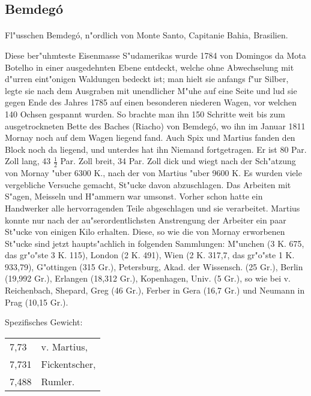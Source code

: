 \documentclass[a4paper, 11pt, oneside]{article}
\begin{document}
\subsection{Bemdegó}
\normalsize
\paragraph{}
Fl"usschen Bemdegó, n"ordlich von Monte Santo, Capitanie Bahia, Brasilien.

Diese ber"uhmteste Eisenmasse S"udamerikas wurde 1784 von Domingos da Mota Botelho in einer ausgedehnten Ebene entdeckt, welche ohne Abwechselung mit d"urren eint"onigen Waldungen bedeckt ist; man hielt sie anfangs f"ur Silber, legte sie nach dem Ausgraben mit unendlicher M"uhe auf eine Seite und lud sie gegen Ende des Jahres 1785 auf einen besonderen niederen Wagen, vor welchen 140 Ochsen gespannt wurden. So brachte man ihn 150 Schritte weit bis zum ausgetrockneten Bette des Baches (Riacho) von Bemdegó, wo ihn im Januar 1811 Mornay noch auf dem Wagen liegend fand. Auch Spix und Martius fanden den Block noch da liegend, und unterdes hat ihn Niemand fortgetragen. Er ist 80 Par. Zoll lang, 43 $\frac{1}{2}$ Par. Zoll breit, 34 Par. Zoll dick und wiegt nach der Sch"atzung von Mornay "uber 6300 K., nach der von Martius "uber 9600 K. Es wurden viele vergebliche Versuche gemacht, St"ucke davon abzuschlagen. Das Arbeiten mit S"agen, Meisseln und H"ammern war umsonst. Vorher schon hatte ein Handwerker alle hervorragenden Teile abgeschlagen und sie verarbeitet. Martius konnte nur nach der au"serordentlichsten Anstrengung der Arbeiter ein paar St"ucke von einigen Kilo erhalten. Diese, so wie die von Mornay erworbenen St"ucke sind jetzt haupts"achlich in folgenden Sammlungen: M"unchen (3 K. 675, das gr"o"ste 3 K. 115), London (2 K. 491), Wien (2 K. 317,7, das gr"o"ste 1 K. 933,79), G"ottingen (315 Gr.), Petersburg, Akad. der Wissensch. (25 Gr.), Berlin (19,992 Gr.), Erlangen (18,312 Gr.), Kopenhagen, Univ. (5 Gr.), so wie bei v. Reichenbach, Shepard, Greg (46 Gr.), Ferber in Gera (16,7 Gr.) und Neumann in Prag (10,15 Gr.).

Spezifisches Gewicht:  
\begin{table}[!ht]
    \centering
    \begin{tabular}{l l}
        7,73 & v. Martius,\\
        7,731 & Fickentscher,\\
        7,488 & Rumler.
    \end{tabular}
\end{table}
\end{document}
